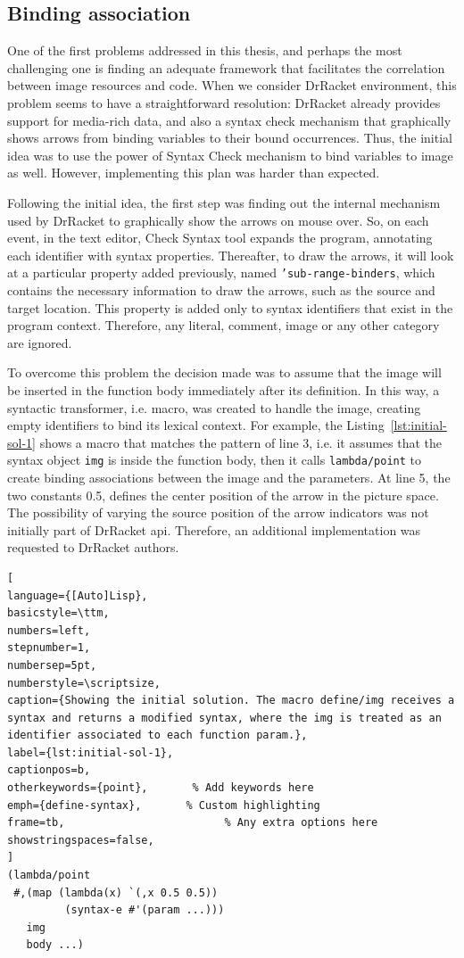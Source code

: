 \subsection{Binding association}

One of the first problems addressed in this thesis, and perhaps the most challenging one is finding an adequate framework that facilitates the correlation between image resources and code. When we consider DrRacket environment, this problem seems to have a straightforward resolution: DrRacket already provides support for media-rich data, and also a syntax check mechanism that graphically shows arrows from binding variables to their bound occurrences. Thus, the initial idea was to use the power of Syntax Check mechanism to bind variables to image as well. However, implementing this plan was harder than expected.

Following the initial idea, the first step was finding out the internal mechanism used by DrRacket to graphically show the arrows on mouse over. So, on each event, in the text editor, Check Syntax tool expands the program, annotating each identifier with syntax properties. Thereafter, to draw the arrows, it will look at a particular property added previously, named \texttt{'sub-range-binders}, which contains the necessary information to draw the arrows, such as the source and target location. This property is added only to syntax identifiers that exist in the program context. Therefore, any literal, comment, image or any other category are ignored.

To overcome this problem the decision made was to assume that the image will be inserted in the function body immediately after its definition. In this way, a syntactic transformer, i.e. macro, was created to handle the image, creating empty identifiers to bind its lexical context. For example, the Listing~\ref{lst:initial-sol-1} shows a macro that matches the pattern of line 3, i.e. it assumes that the syntax object \texttt{img} is inside the function body, then it calls \texttt{lambda/point} to create binding associations between the image and the parameters. At line 5, the two constants 0.5, defines the center position of the arrow in the picture space. The possibility of varying the source position of the arrow indicators was not initially part of DrRacket \gls{api}. Therefore, an additional implementation was requested to DrRacket authors.

\begin{lstlisting}[
language={[Auto]Lisp},
basicstyle=\ttm,
numbers=left,
stepnumber=1,
numbersep=5pt,                   
numberstyle=\scriptsize, 
caption={Showing the initial solution. The macro define/img receives a syntax and returns a modified syntax, where the img is treated as an identifier associated to each function param.},
label={lst:initial-sol-1},
captionpos=b, 
otherkeywords={point},       % Add keywords here
emph={define-syntax},       % Custom highlighting
frame=tb,                         % Any extra options here
showstringspaces=false,
]
(lambda/point 
 #,(map (lambda(x) `(,x 0.5 0.5)) 
         (syntax-e #'(param ...)))
   img
   body ...)
\end{lstlisting}


